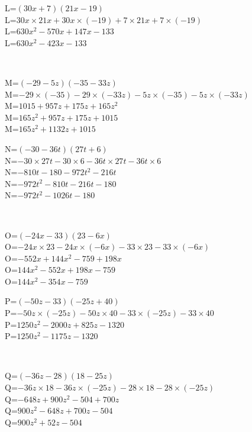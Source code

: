 \documentclass{article}%
\begin{document}
\begin{minipage}{0.5\textwidth}%
L=$(30x+7)(21x-19)$\\%
L=$30x \times 21x+30x \times (-19)+7 \times 21x+7 \times (-19)$\\%
L=$630x^2-570x+147x-133$\\%
L=$630x^2-423x-133$\\%
\end{minipage}%
\\%
\begin{minipage}{0.5\textwidth}%
M=$(-29-5z)(-35-33z)$\\%
M=$-29 \times (-35)-29 \times (-33z)-5z \times (-35)-5z \times (-33z)$\\%
M=$1015+957z+175z+165z^2$\\%
M=$165z^2+957z+175z+1015$\\%
M=$165z^2+1132z+1015$\\%
\end{minipage}%
\begin{minipage}{0.5\textwidth}%
N=$(-30-36t)(27t+6)$\\%
N=$-30 \times 27t-30 \times 6-36t \times 27t-36t \times 6$\\%
N=$-810t-180-972t^2-216t$\\%
N=$-972t^2-810t-216t-180$\\%
N=$-972t^2-1026t-180$\\%
\end{minipage}%
\\%
\begin{minipage}{0.5\textwidth}%
O=$(-24x-33)(23-6x)$\\%
O=$-24x \times 23-24x \times (-6x)-33 \times 23-33 \times (-6x)$\\%
O=$-552x+144x^2-759+198x$\\%
O=$144x^2-552x+198x-759$\\%
O=$144x^2-354x-759$\\%
\end{minipage}%
\begin{minipage}{0.5\textwidth}%
P=$(-50z-33)(-25z+40)$\\%
P=$-50z \times (-25z)-50z \times 40-33 \times (-25z)-33 \times 40$\\%
P=$1250z^2-2000z+825z-1320$\\%
P=$1250z^2-1175z-1320$\\%
\end{minipage}%
\\%
\begin{minipage}{0.5\textwidth}%
Q=$(-36z-28)(18-25z)$\\%
Q=$-36z \times 18-36z \times (-25z)-28 \times 18-28 \times (-25z)$\\%
Q=$-648z+900z^2-504+700z$\\%
Q=$900z^2-648z+700z-504$\\%
Q=$900z^2+52z-504$\\%
\end{minipage}%
\end{document}
